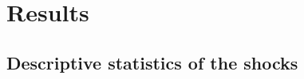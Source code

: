 \documentclass[12pt]{article}
\begin{document}






\section{Results} \label{results}

\subsection{Descriptive statistics of the shocks}
\end{document}
